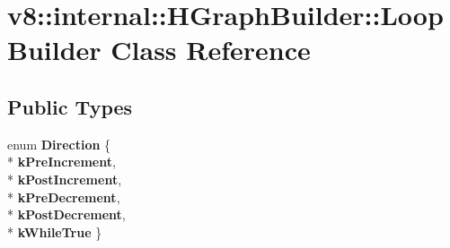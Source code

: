 \hypertarget{classv8_1_1internal_1_1_h_graph_builder_1_1_loop_builder}{}\section{v8\+:\+:internal\+:\+:H\+Graph\+Builder\+:\+:Loop\+Builder Class Reference}
\label{classv8_1_1internal_1_1_h_graph_builder_1_1_loop_builder}
\subsection*{Public Types}
\begin{DoxyCompactItemize}
\item 
enum {\bfseries Direction} \{ \\*
{\bfseries k\+Pre\+Increment}, 
\\*
{\bfseries k\+Post\+Increment}, 
\\*
{\bfseries k\+Pre\+Decrement}, 
\\*
{\bfseries k\+Post\+Decrement}, 
\\*
{\bfseries k\+While\+True}
 \}\hypertarget{classv8_1_1internal_1_1_h_graph_builder_1_1_loop_builder_a92b0f452334fdd92fc3a095a30ac2617}{}\label{classv8_1_1internal_1_1_h_graph_builder_1_1_loop_builder_a92b0f452334fdd92fc3a095a30ac2617}

\end{DoxyCompactItemize}
